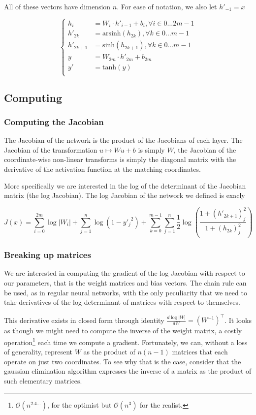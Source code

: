 \documentclass{article}
\begin{document}
All of these vectors have dimension \(n\). For ease of notation, we also let
\(h'_{-1} = x\)

\[
  \left\{
    \begin{aligned}
      h_{i} &= W_{i} \cdot  h'_{i-1} + b_{i}, \forall i \in 0 \ldots 2m-1 \\
      h'_{2k} &= \mathrm{arsinh}(h_{2k}), \forall k \in 0 \ldots m-1 \\
      h'_{2k+1} &= \mathrm{sinh}(h_{2k+1}), \forall k \in 0 \ldots m-1\\
      y &= W_{2m} \cdot h'_{2m} + b_{2m}  \\
      y' &= \mathrm{tanh}(y) \\
    \end{aligned}
  \right.
\]

\subsection{Computing}

\subsubsection{Computing the Jacobian}
The Jacobian  of the network is the product of the Jacobians of each
layer. The Jacobian of the transformation \( u \mapsto W u + b \) is simply
\(W\), the Jacobian of the coordinate-wise non-linear transforms is simply
the diagonal matrix with the derivative of the activation function at the
matching coordinates.

More specifically we are interested in the log of the determinant of the
Jacobian matrix (the log Jacobian). The log Jacobian of the network we defined
is exacly

\[
  J(x) = \sum_{i=0}^{2m} \log |W_{i}| +
  \sum_{j=1}^n \log(1-{y'_j}^2)
  +  \sum_{k=0}^{m-1} \sum_{j=1}^n
  \frac{1}{2} \log \left(\frac{1 + (h'_{2k+1})_j^2}{1 + (h_{2k})_j^2}\right)
\]

\subsubsection{Breaking up matrices}
We are interested in computing the gradient of the log Jacobian with respect to
our parameters, that is the weight matrices and bias vectors. The chain rule
can be used, as in regular neural networks, with the only peculiarity that we
need to take derivatives of the log determinant of matrices with respect to
themselves.

This derivative exists in closed form through identity
\(\frac{d \log |W|}{d W} = (W^{-1})^\top\). It looks as
though we might need to compute the inverse of the weight matrix, a costly
operation\footnote{\(\mathcal{O}(n^{2.4\ldots})\), for the optimist but
  \(\mathcal{O}(n^3)\) for the realist.}
each time we compute a gradient. Fortunately, we can, without a loss of
generality, represent \(W\) as the product of \(n(n-1)\) matrices that each
operate on just two coordinates. To see why that is the case, consider that
the gaussian elimination algorithm expresses the inverse of a matrix as the
product of such elementary matrices.
\end{document}
